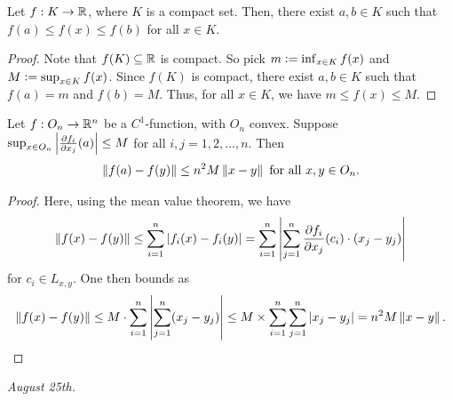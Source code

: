 \begin{theorem}
    Let $f:K \to \mathbb{R}$, where $K$ is a compact set. Then, there exist $a,b \in K$ such that $f(a) \leq f(x) \leq f(b)$ for all $x \in K$.
\end{theorem}
\begin{proof}
    Note that $f(K) \subseteq \mathbb{R}$ is compact. So pick $m \vcentcolon= \inf_{x \in K} f(x)$ and $M \vcentcolon= \sup_{x \in K} f(x)$. Since $f(K)$ is compact, there exist $a,b \in K$ such that $f(a) = m$ and $f(b) = M$. Thus, for all $x \in K$, we have $m \leq f(x) \leq M$.
\end{proof}

\begin{lemma}
    Let $f:O_{n} \to \mathbb{R}^{n}$ be a $C^{1}$-function, with $O_{n}$ convex. Suppose $\sup_{x \in O_{n}} \left| \frac{\partial f_{i}}{\partial x_{j}}(a) \right| \leq M$ for all $i,j = 1,2,\ldots,n$. Then
    \begin{align}
        \left\lVert f(a)-f(y)\right\rVert \leq n^{2}M \left\lVert x-y\right\rVert \text{ for all } x,y \in O_{n}.
    \end{align}
\end{lemma}
\begin{proof}
    Here, using the mean value theorem, we have
    \begin{align}
        \left\lVert f(x)-f(y)\right\rVert \leq \sum_{i=1}^{n} \left| f_{i}(x)-f_{i}(y) \right| = \sum_{i=1}^{n} \left| \sum_{j=1}^{n}\frac{\partial f_{i}}{\partial x_{j}}(c_{i}) \cdot (x_{j}-y_{j}) \right|
    \end{align}
    for $c_{i} \in L_{x,y}$. One then bounds as
    \begin{align}
        \left\lVert f(x)-f(y)\right\rVert \leq M \cdot \sum_{i=1}^{n} \left| \sum_{j=1}^{n}(x_{j}-y_{j}) \right| \leq M \times \sum_{i=1}^{n} \sum_{j=1}^{n} \left| x_{j}-y_{j} \right| = n^{2}M \left\lVert x-y\right\rVert.
    \end{align}
\end{proof}

\textit{August 25th.}

